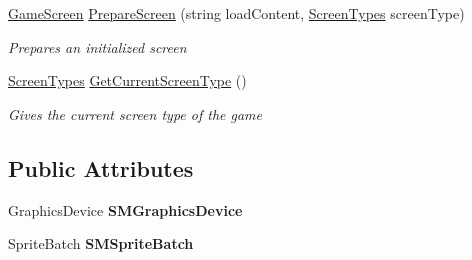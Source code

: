 \begin{DoxyCompactItemize}
\hyperlink{class_hel_project_1_1_u_i_1_1_game_screen}{Game\+Screen} \hyperlink{class_hel_project_1_1_u_i_1_1_screen_manager_a61f086a7ce24b6c365d09c5a0d4f74bb}{Prepare\+Screen} (string load\+Content, \hyperlink{class_hel_project_1_1_u_i_1_1_screen_manager_af86dcb0d11cec6ce52f50e9b98798175}{Screen\+Types} screen\+Type)
\begin{DoxyCompactList}\small\item\em Prepares an initialized screen \end{DoxyCompactList}\item 
\hyperlink{class_hel_project_1_1_u_i_1_1_screen_manager_af86dcb0d11cec6ce52f50e9b98798175}{Screen\+Types} \hyperlink{class_hel_project_1_1_u_i_1_1_screen_manager_a7c9a1573412a1177692cfff5302a63cc}{Get\+Current\+Screen\+Type} ()
\begin{DoxyCompactList}\small\item\em Gives the current screen type of the game \end{DoxyCompactList}\end{DoxyCompactItemize}
\subsection*{Public Attributes}
\begin{DoxyCompactItemize}
\item 
\hypertarget{class_hel_project_1_1_u_i_1_1_screen_manager_a3d4d17256df969e1b5627c3112cf4415}{}Graphics\+Device {\bfseries S\+M\+Graphics\+Device}\label{class_hel_project_1_1_u_i_1_1_screen_manager_a3d4d17256df969e1b5627c3112cf4415}

\item 
\hypertarget{class_hel_project_1_1_u_i_1_1_screen_manager_abebd23e127c1340fbb916fa14cf5b1a4}{}Sprite\+Batch {\bfseries S\+M\+Sprite\+Batch}\label{class_hel_project_1_1_u_i_1_1_screen_manager_abebd23e127c1340fbb916fa14cf5b1a4}

\end{DoxyCompactItemize}

